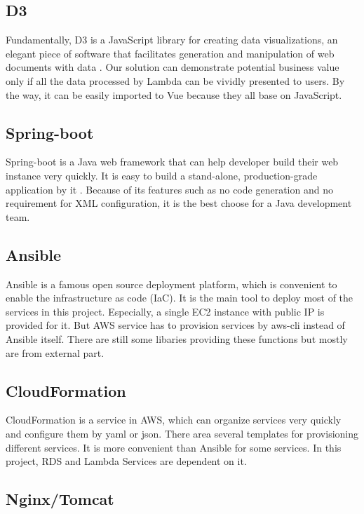 \documentclass[conference]{IEEEtran}
\begin{document}
\subsection{D3}

Fundamentally, D3 is a JavaScript library for creating data visualizations, an elegant piece of software that facilitates 
generation and manipulation of web documents with data \cite{2013Interactive}. Our solution can demonstrate potential business 
value only if all the data processed by Lambda can be vividly presented to users. By the way, it can be easily imported to 
Vue because they all base on JavaScript.
 
\subsection{Spring-boot}

Spring-boot is a Java web framework that can help developer build their web instance very quickly. It is easy to build a 
stand-alone, production-grade application by it \cite{SpringBo66:online}. Because of its features such as no code generation 
and no requirement for XML configuration, it is the best choose for a Java development team.

\subsection{Ansible}

Ansible is a famous open source deployment platform, which is convenient to enable the infrastructure as code (IaC). 
It is the main tool to deploy most of the services in this project. Especially, a single EC2 instance with public 
IP is provided for it. But AWS service has to provision services by aws-cli instead of Ansible itself. There are still 
some libaries providing these functions but mostly are from external part.

\subsection{CloudFormation}

CloudFormation is a service in AWS, which can organize services very quickly and configure them by yaml or json. There area
several templates for provisioning different services. It is more convenient than Ansible for some services. In this project, 
RDS and Lambda Services are dependent on it.

\subsection{Nginx/Tomcat}
\end{document}
